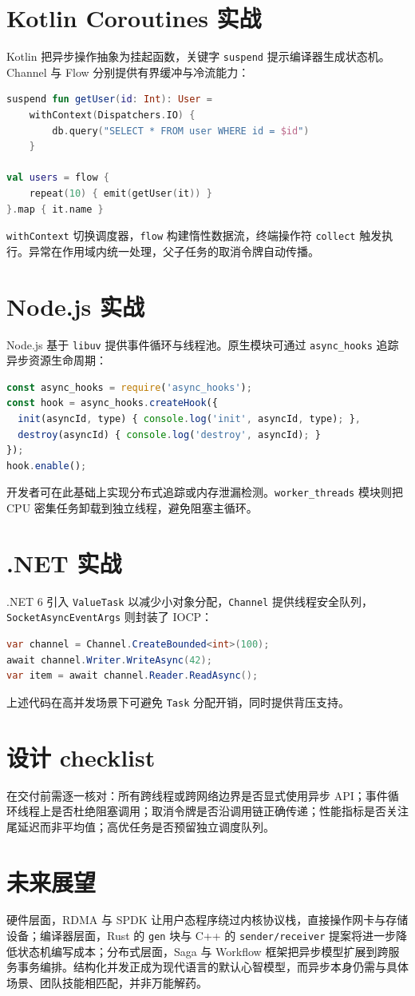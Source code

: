 \chapter{Kotlin Coroutines 实战}
Kotlin 把异步操作抽象为挂起函数，关键字 \texttt{suspend} 提示编译器生成状态机。Channel 与 Flow 分别提供有界缓冲与冷流能力：\par
\begin{lstlisting}[language=kotlin]
suspend fun getUser(id: Int): User =
    withContext(Dispatchers.IO) {
        db.query("SELECT * FROM user WHERE id = $id")
    }

val users = flow {
    repeat(10) { emit(getUser(it)) }
}.map { it.name }
\end{lstlisting}
\texttt{withContext} 切换调度器，\texttt{flow} 构建惰性数据流，终端操作符 \texttt{collect} 触发执行。异常在作用域内统一处理，父子任务的取消令牌自动传播。\par
\chapter{Node.js 实战}
Node.js 基于 \texttt{libuv} 提供事件循环与线程池。原生模块可通过 \texttt{async\_{}hooks} 追踪异步资源生命周期：\par
\begin{lstlisting}[language=js]
const async_hooks = require('async_hooks');
const hook = async_hooks.createHook({
  init(asyncId, type) { console.log('init', asyncId, type); },
  destroy(asyncId) { console.log('destroy', asyncId); }
});
hook.enable();
\end{lstlisting}
开发者可在此基础上实现分布式追踪或内存泄漏检测。\texttt{worker\_{}threads} 模块则把 CPU 密集任务卸载到独立线程，避免阻塞主循环。\par
\chapter{.NET 实战}
.NET 6 引入 \texttt{ValueTask} 以减少小对象分配，\texttt{Channel} 提供线程安全队列，\texttt{SocketAsyncEventArgs} 则封装了 IOCP：\par
\begin{lstlisting}[language=csharp]
var channel = Channel.CreateBounded<int>(100);
await channel.Writer.WriteAsync(42);
var item = await channel.Reader.ReadAsync();
\end{lstlisting}
上述代码在高并发场景下可避免 \texttt{Task} 分配开销，同时提供背压支持。\par
\chapter{设计 checklist}
在交付前需逐一核对：所有跨线程或跨网络边界是否显式使用异步 API；事件循环线程上是否杜绝阻塞调用；取消令牌是否沿调用链正确传递；性能指标是否关注尾延迟而非平均值；高优任务是否预留独立调度队列。\par
\chapter{未来展望}
硬件层面，RDMA 与 SPDK 让用户态程序绕过内核协议栈，直接操作网卡与存储设备；编译器层面，Rust 的 \texttt{gen} 块与 C++ 的 \texttt{sender/receiver} 提案将进一步降低状态机编写成本；分布式层面，Saga 与 Workflow 框架把异步模型扩展到跨服务事务编排。结构化并发正成为现代语言的默认心智模型，而异步本身仍需与具体场景、团队技能相匹配，并非万能解药。\par
